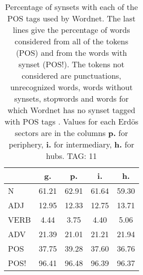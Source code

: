 \begin{table}[h!]
\begin{center}
\begin{tabular}{| l || c | c | c | c |}\hline
 & {\bf g.} & {\bf p.} & {\bf i.} & {\bf h.} \\\hline\hline
N & 61.21  & 62.91  & 61.64  & 59.30 \\\hline
ADJ & 12.95  & 12.33  & 12.75  & 13.71 \\\hline
VERB & 4.44  & 3.75  & 4.40  & 5.06 \\\hline
ADV & 21.39  & 21.01  & 21.21  & 21.94 \\\hline\hline
POS & 37.75  & 39.28  & 37.60  & 36.76 \\\hline
POS! & 96.41  & 96.48  & 96.39  & 96.37 \\\hline
\end{tabular}
\caption{Percentage of synsets with each of the POS tags used by Wordnet. The last lines give the percentage of words considered from all of the tokens (POS) and from the words with synset (POS!). The tokens not considered are punctuations, unrecognized words, words without synsets, stopwords and words for which Wordnet has no synset  tagged with POS tags . Values for each Erd\"os sectors are in the columns {{\bf p.}} for periphery, {{\bf i.}} for intermediary, {{\bf h.}} for hubs. TAG: 11}
\end{center}
\end{table}